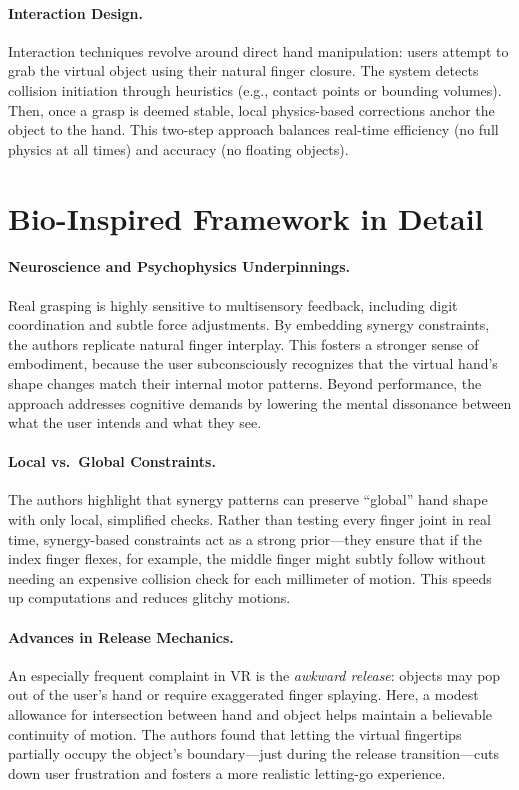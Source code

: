 \documentclass[11pt]{llncs}
\begin{document}
\paragraph{Interaction Design.}
Interaction techniques revolve around direct hand manipulation: users attempt to grab the virtual object using their natural finger closure. The system detects collision initiation through heuristics (e.g., contact points or bounding volumes). Then, once a grasp is deemed stable, local physics-based corrections anchor the object to the hand. This two-step approach balances real-time efficiency (no full physics at all times) and accuracy (no floating objects).

\section*{Bio-Inspired Framework in Detail}
\paragraph{Neuroscience and Psychophysics Underpinnings.}
Real grasping is highly sensitive to multisensory feedback, including digit coordination and subtle force adjustments. By embedding synergy constraints, the authors replicate natural finger interplay. This fosters a stronger sense of embodiment, because the user subconsciously recognizes that the virtual hand’s shape changes match their internal motor patterns. Beyond performance, the approach addresses cognitive demands by lowering the mental dissonance between what the user intends and what they see.

\paragraph{Local vs.\ Global Constraints.}
The authors highlight that synergy patterns can preserve ``global'' hand shape with only local, simplified checks. Rather than testing every finger joint in real time, synergy-based constraints act as a strong prior---they ensure that if the index finger flexes, for example, the middle finger might subtly follow without needing an expensive collision check for each millimeter of motion. This speeds up computations and reduces glitchy motions.

\paragraph{Advances in Release Mechanics.}
An especially frequent complaint in VR is the \emph{awkward release}: objects may pop out of the user’s hand or require exaggerated finger splaying. Here, a modest allowance for intersection between hand and object helps maintain a believable continuity of motion. The authors found that letting the virtual fingertips partially occupy the object’s boundary—just during the release transition—cuts down user frustration and fosters a more realistic letting-go experience.
\end{document}
